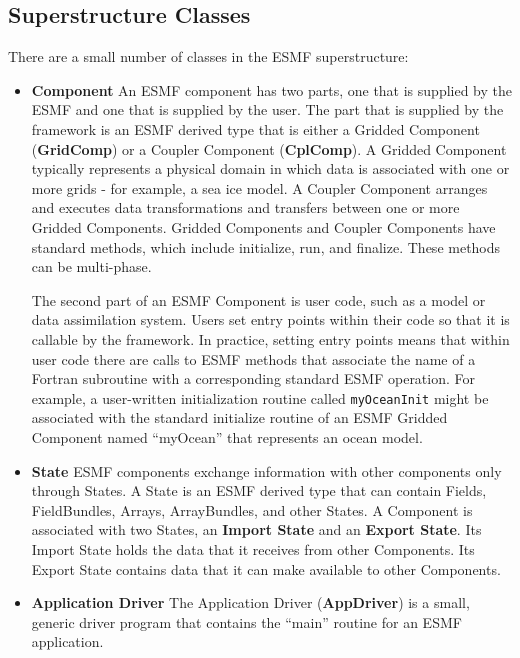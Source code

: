 \subsection{Superstructure Classes}

There are a small number of classes in the ESMF superstructure:

\begin{itemize}
\item {\bf Component}  An ESMF component has two parts, one that is 
supplied by the ESMF and one that is supplied by the user.  The
part that is supplied by the framework is an ESMF derived type that
is either a Gridded Component ({\bf GridComp}) or a Coupler 
Component ({\bf CplComp}).  A Gridded Component typically represents
a physical domain in which data is associated with one or more 
grids - for example, a sea ice model.  A Coupler Component 
arranges and executes data transformations and transfers between
one or more Gridded Components. Gridded Components and Coupler 
Components have standard methods, which include initialize, run,
and finalize.  These methods can be multi-phase.

The second part of an ESMF Component is user code, such as a
model or data assimilation system.  Users set entry points 
within their code so that it is callable by the framework.  
In practice, setting entry points means that within user code 
there are calls to ESMF methods that associate the name of a 
Fortran subroutine with a corresponding standard ESMF operation.  
For example, a user-written initialization routine called 
{\tt myOceanInit} might be associated with the standard 
initialize routine of an ESMF Gridded Component named ``myOcean'' 
that represents an ocean model.

\item {\bf State}  ESMF components exchange information with other 
components only through States.  A State is an ESMF derived
type that can contain Fields, FieldBundles, Arrays, ArrayBundles,
and other States.  A Component is associated with two States, an 
{\bf Import State} and an {\bf Export State}.  Its Import State 
holds the data that it receives from other Components.  
Its Export State contains data that it can make available to 
other Components. 

\item {\bf Application Driver} The Application Driver ({\bf AppDriver}) 
is a small, generic driver program that contains the ``main'' 
routine for an ESMF application.

\end{itemize}

